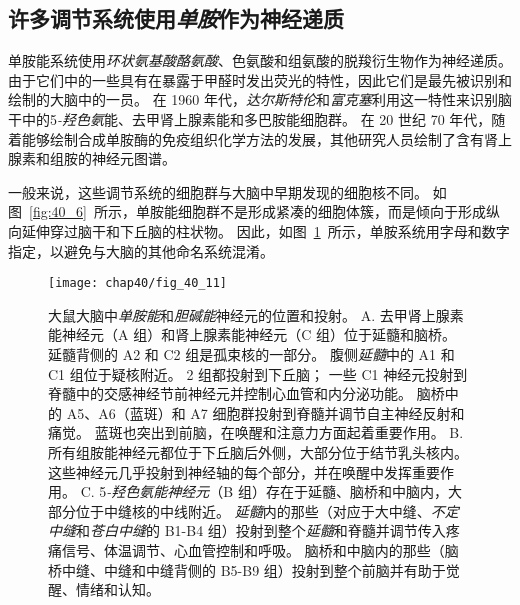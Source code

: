 \subsection{许多调节系统使用\textit{单胺}作为神经递质}

单胺能系统使用\textit{环状氨基酸酪氨酸}、色氨酸和组氨酸的脱羧衍生物作为神经递质。
由于它们中的一些具有在暴露于甲醛时发出荧光的特性，因此它们是最先被识别和绘制的大脑中的一员。
在 1960 年代，\textit{达尔斯特伦}和\textit{富克塞}利用这一特性来识别脑干中的5\textit{-羟色氨}能、去甲肾上腺素能和多巴胺能细胞群。
在 20 世纪 70 年代，随着能够绘制合成单胺酶的免疫组织化学方法的发展，其他研究人员绘制了含有肾上腺素和组胺的神经元图谱。


一般来说，这些调节系统的细胞群与大脑中早期发现的细胞核不同。
如图~\ref{fig:40_6}~所示，单胺能细胞群不是形成紧凑的细胞体簇，而是倾向于形成纵向延伸穿过脑干和下丘脑的柱状物。
因此，如图~\ref{fig:40_11}~所示，单胺系统用字母和数字指定，以避免与大脑的其他命名系统混淆。


\begin{figure}[htbp]
	\centering
	\texttt{[image: chap40/fig\_40\_11]}
	\caption{大鼠大脑中\textit{单胺能}和\textit{胆碱能}神经元的位置和投射。
		A. 去甲肾上腺素能神经元（A 组）和肾上腺素能神经元（C 组）位于延髓和脑桥。
		延髓背侧的 A2 和 C2 组是孤束核的一部分。
		腹侧\textit{延髓}中的 A1 和 C1 组位于疑核附近。
		2 组都投射到下丘脑；
		一些 C1 神经元投射到脊髓中的交感神经节前神经元并控制心血管和内分泌功能。
		脑桥中的 A5、A6（蓝斑）和 A7 细胞群投射到脊髓并调节自主神经反射和痛觉。
		蓝斑也突出到前脑，在唤醒和注意力方面起着重要作用。
		B. 所有组胺能神经元都位于下丘脑后外侧，大部分位于结节乳头核内。
		这些神经元几乎投射到神经轴的每个部分，并在唤醒中发挥重要作用。
		C. 5\textit{-羟色氨能神经元}（B 组）存在于延髓、脑桥和中脑内，大部分位于中缝核的中线附近。
		\textit{延髓}内的那些（对应于大中缝、\textit{不定中缝}和\textit{苍白中缝}的 B1-B4 组）投射到整个\textit{延髓}和脊髓并调节传入疼痛信号、体温调节、心血管控制和呼吸。
		脑桥和中脑内的那些（脑桥中缝、中缝和中缝背侧的 B5-B9 组）投射到整个前脑并有助于觉醒、情绪和认知。}
	\label{fig:40_11}
\end{figure}


